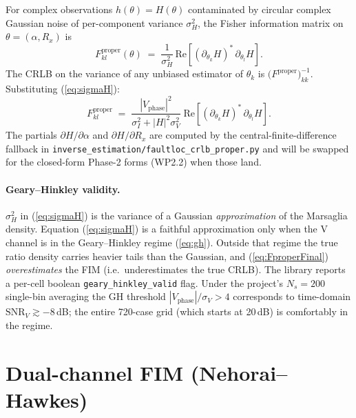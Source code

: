 \documentclass[11pt,a4paper]{article}
\begin{document}
For complex observations $h(\theta) = H(\theta)$ contaminated by
circular complex Gaussian noise of per-component variance $\sigma_H^2$,
the Fisher information matrix on $\theta = (\alpha, R_x)$ is
\cite{Kay1993Vol1}
\begin{equation}
   F^{\mathrm{proper}}_{kl}(\theta) \;=\; \frac{1}{\sigma_H^2}\,
         \mathrm{Re}\!\left[
           \left(\partial_{\theta_k} H\right)^{\!*}
           \,\partial_{\theta_l} H
         \right].
   \label{eq:Fproper}
\end{equation}
The CRLB on the variance of any unbiased estimator of $\theta_k$ is
$\bigl(F^{\mathrm{proper}}\bigr)^{-1}_{kk}$.  Substituting
(\ref{eq:sigmaH}):
\begin{equation}
   F^{\mathrm{proper}}_{kl}
       \;=\;
       \frac{|V_{\mathrm{phase}}|^2}
            {\sigma_I^2 + |H|^2 \sigma_V^2}\;
       \mathrm{Re}\!\left[
         \left(\partial_{\theta_k} H\right)^{\!*}
         \,\partial_{\theta_l} H
       \right].
   \label{eq:FproperFinal}
\end{equation}
The partials $\partial H/\partial \alpha$ and $\partial H/\partial R_x$
are computed by the central-finite-difference fallback in
\texttt{inverse\_estimation/faultloc\_crlb\_proper.py} and will be
swapped for the closed-form Phase-2 forms (WP2.2) when those land.

\paragraph{Geary--Hinkley validity.}  $\sigma_H^2$ in
(\ref{eq:sigmaH}) is the variance of a Gaussian \emph{approximation}
of the Marsaglia density.  Equation (\ref{eq:sigmaH}) is a faithful
approximation only when the V channel is in the Geary--Hinkley regime
(\ref{eq:gh}).  Outside that regime the true ratio density carries
heavier tails than the Gaussian, and (\ref{eq:FproperFinal})
\emph{overestimates} the FIM (i.e.\ underestimates the true CRLB).
The library reports a per-cell boolean \texttt{geary\_hinkley\_valid}
flag.  Under the project's $N_s = 200$ single-bin averaging the GH
threshold $|V_{\mathrm{phase}}|/\sigma_V > 4$ corresponds to
time-domain $\mathrm{SNR}_V \gtrsim -8$\,dB; the entire 720-case
grid (which starts at 20\,dB) is comfortably in the regime.

\section{Dual-channel FIM (Nehorai--Hawkes)}
\end{document}
